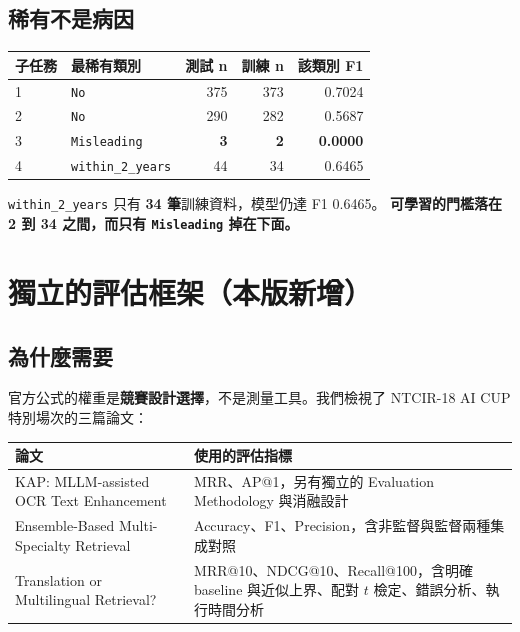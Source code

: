 \documentclass[11pt,a4paper]{ctexart}
\newcommand{\fn}[1]{\texttt{#1}}
\begin{document}
\subsection{稀有不是病因}

\begin{table}[h]
\centering\small
\begin{tabular}{@{}llrrr@{}}
\toprule
子任務 & 最稀有類別 & 測試 n & 訓練 n & 該類別 F1 \\
\midrule
\textcircled{1} & \fn{No} & 375 & 373 & 0.7024 \\
\textcircled{2} & \fn{No} & 290 & 282 & 0.5687 \\
\rowcolor{red!10}
\textcircled{3} & \fn{Misleading} & \textbf{3} & \textbf{2} & \textbf{0.0000} \\
\textcircled{4} & \fn{within\_2\_years} & 44 & 34 & 0.6465 \\
\bottomrule
\end{tabular}
\end{table}

\fn{within\_2\_years} 只有 \textbf{34 筆}訓練資料，模型仍達 F1 0.6465。
\textbf{可學習的門檻落在 2 到 34 之間，而只有 \fn{Misleading} 掉在下面。}

\section{獨立的評估框架（本版新增）}
\label{sec:framework}

\subsection{為什麼需要}

官方公式的權重是\textbf{競賽設計選擇}，不是測量工具。我們檢視了 NTCIR-18 AI CUP
特別場次的三篇論文：

\begin{table}[h]
\centering\small
\begin{tabular}{@{}p{5.6cm}p{8.2cm}@{}}
\toprule
論文 & 使用的評估指標 \\
\midrule
KAP: MLLM-assisted OCR Text Enhancement & MRR、AP@1，另有獨立的 Evaluation Methodology 與消融設計 \\
Ensemble-Based Multi-Specialty Retrieval & Accuracy、F1、Precision，含非監督與監督兩種集成對照 \\
Translation or Multilingual Retrieval? & MRR@10、NDCG@10、Recall@100，含明確 baseline 與近似上界、配對 $t$ 檢定、錯誤分析、執行時間分析 \\
\bottomrule
\end{tabular}
\end{table}
\end{document}
